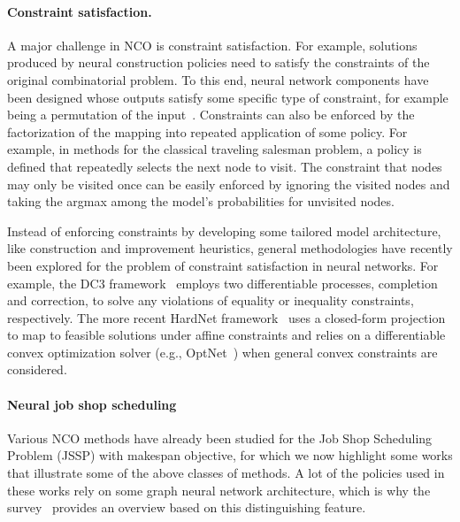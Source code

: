 \documentclass[a4paper]{report}
\theoremstyle{definition}
\theoremstyle{plain}
\begin{document}


\paragraph{Constraint satisfaction.}
A major challenge in NCO is constraint satisfaction. For example, solutions
produced by neural construction policies need to satisfy the constraints of the
original combinatorial problem. To this end, neural network components have been
designed whose outputs satisfy some specific type of constraint, for example
being a permutation of the input~\cite{vinyalsPointerNetworks2017a}. Constraints can also be enforced by
the factorization of the mapping into repeated application of some policy. For
example, in methods for the classical traveling salesman problem, a policy is
defined that repeatedly selects the next node to visit. The constraint that
nodes may only be visited once can be easily enforced by ignoring the visited
nodes and taking the argmax among the model's probabilities for unvisited nodes.


Instead of enforcing constraints by developing some tailored model architecture,
like construction and improvement heuristics, general methodologies have
recently been explored for the problem of constraint satisfaction in neural
networks. For example, the DC3 framework~\cite{dontiDC3LearningMethod2021}
employs two differentiable processes, completion and correction, to solve any
violations of equality or inequality constraints, respectively. The more recent
HardNet framework~\cite{minHardConstrainedNeuralNetworks2024} uses a closed-form
projection to map to feasible solutions under affine constraints and relies on a
differentiable convex optimization solver (e.g.,
OptNet~\cite{amosOptNetDifferentiableOptimization2021a}) when general convex
constraints are considered.

\paragraph{Neural job shop scheduling}
Various NCO methods have already been studied for the Job Shop Scheduling Problem
(JSSP) with makespan objective, for which we now highlight some works that
illustrate some of the above classes of methods. A lot of the policies used in
these works rely on some graph neural network architecture, which is why the
survey~\cite{smitGraphNeuralNetworks2024} provides an overview based on this distinguishing feature.
\end{document}
